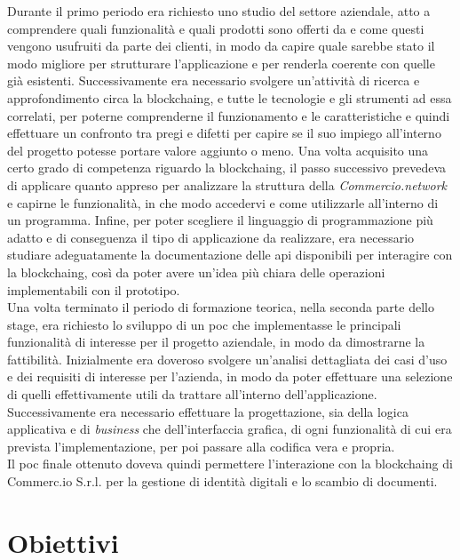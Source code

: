 Durante il primo periodo era richiesto uno studio del settore aziendale, atto a comprendere quali funzionalità e quali prodotti sono offerti da \myCompany{} \companyTitle{} e come questi vengono usufruiti da parte dei clienti, in modo da capire quale sarebbe stato il modo migliore per strutturare l'applicazione e per renderla coerente con quelle già esistenti. Successivamente era necessario svolgere un'attività di ricerca e approfondimento circa la \gls{blockchaing}, e tutte le tecnologie e gli strumenti ad essa correlati, per poterne comprenderne il funzionamento e le caratteristiche e quindi effettuare un confronto tra pregi e difetti per capire se il suo impiego all'interno del progetto potesse portare valore aggiunto o meno. Una volta acquisito una certo grado di competenza riguardo la \gls{blockchaing}, il passo successivo prevedeva di applicare quanto appreso per analizzare la struttura della \textit{Commercio.network} e capirne le funzionalità, in che modo accedervi e come utilizzarle all'interno di un programma. Infine, per poter scegliere il linguaggio di programmazione più adatto e di conseguenza il tipo di applicazione da realizzare, era necessario studiare adeguatamente la documentazione delle \gls{api} disponibili per interagire con la \gls{blockchaing}, così da poter avere un'idea più chiara delle operazioni implementabili con il prototipo.\\
Una volta terminato il periodo di formazione teorica, nella seconda parte dello stage, era richiesto lo sviluppo di un \gls{poc} che implementasse le principali funzionalità di interesse per il progetto aziendale, in modo da dimostrarne la fattibilità. Inizialmente era doveroso svolgere un'analisi dettagliata dei casi d'uso e dei requisiti di interesse per l'azienda, in modo da poter effettuare una selezione di quelli effettivamente utili da trattare all'interno dell'applicazione. Successivamente era necessario effettuare la progettazione, sia della logica applicativa e di \textit{business} che dell'interfaccia grafica, di ogni funzionalità di cui era prevista l'implementazione, per poi passare alla codifica vera e propria.\\
Il \gls{poc} finale ottenuto doveva quindi permettere l'interazione con la \gls{blockchaing} di Commerc.io S.r.l. per la gestione di identità digitali e lo scambio di documenti.

\section{Obiettivi}


